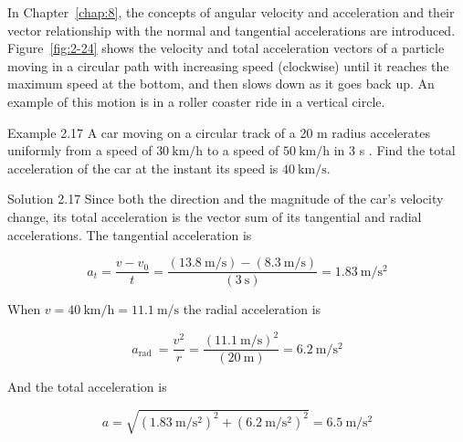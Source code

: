 \documentclass[10pt]{article}
\numberwithin{equation}{section}
\begin{document}
In Chapter~\ref{chap:8}, the concepts of angular velocity and acceleration and their vector relationship with the normal and tangential accelerations are introduced. Figure~\ref{fig:2-24} shows the velocity and total acceleration vectors of a particle moving in a circular path with increasing speed (clockwise) until it reaches the maximum speed at the bottom, and then slows down as it goes back up. An example of this motion is in a roller coaster ride in a vertical circle.

Example 2.17 A car moving on a circular track of a 20 m radius accelerates uniformly from a speed of $30 \mathrm{~km} / \mathrm{h}$ to a speed of $50 \mathrm{~km} / \mathrm{h}$ in 3 s . Find the total acceleration of the car at the instant its speed is $40 \mathrm{~km} / \mathrm{s}$.

Solution 2.17 Since both the direction and the magnitude of the car's velocity change, its total acceleration is the vector sum of its tangential and radial accelerations. The tangential acceleration is

$$
a_{t}=\frac{v-v_{0}}{t}=\frac{(13.8 \mathrm{~m} / \mathrm{s})-(8.3 \mathrm{~m} / \mathrm{s})}{(3 \mathrm{~s})}=1.83 \mathrm{~m} / \mathrm{s}^{2}
$$

When $v=40 \mathrm{~km} / \mathrm{h}=11.1 \mathrm{~m} / \mathrm{s}$ the radial acceleration is

$$
a_{\text {rad }}=\frac{v^{2}}{r}=\frac{(11.1 \mathrm{~m} / \mathrm{s})^{2}}{(20 \mathrm{~m})}=6.2 \mathrm{~m} / \mathrm{s}^{2}
$$

And the total acceleration is

$$
a=\sqrt{\left(1.83 \mathrm{~m} / \mathrm{s}^{2}\right)^{2}+\left(6.2 \mathrm{~m} / \mathrm{s}^{2}\right)^{2}}=6.5 \mathrm{~m} / \mathrm{s}^{2}
$$
\end{document}
